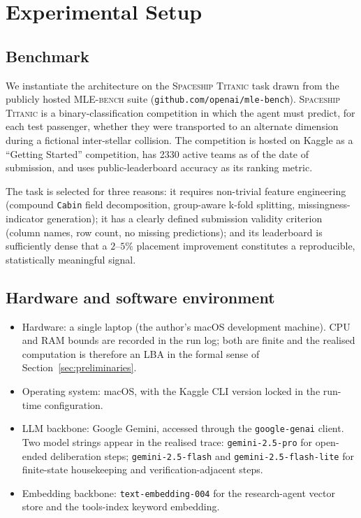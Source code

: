 \section{Experimental Setup}
\label{sec:expsetup}

\subsection{Benchmark}

We instantiate the architecture on the \textsc{Spaceship Titanic}
task drawn from the publicly hosted \textsc{MLE-bench} suite
(\texttt{github.com/openai/mle-bench}).
\textsc{Spaceship Titanic} is a binary-classification competition
in which the agent must predict, for each test passenger, whether
they were transported to an alternate dimension during a fictional
inter-stellar collision.  The competition is hosted on Kaggle as a
``Getting Started'' competition, has 2330 active teams as of the
date of submission, and uses public-leaderboard accuracy as its
ranking metric.

The task is selected for three reasons: it requires non-trivial
feature engineering (compound \texttt{Cabin} field decomposition,
group-aware k-fold splitting, missingness-indicator generation);
it has a clearly defined submission validity criterion (column
names, row count, no missing predictions); and its leaderboard is
sufficiently dense that a $2$--$5\%$ placement improvement
constitutes a reproducible, statistically meaningful signal.

\subsection{Hardware and software environment}

\begin{itemize}
\item Hardware: a single laptop (the author's macOS development
machine).  CPU and RAM bounds are recorded in the run log; both
are finite and the realised computation is therefore an LBA in
the formal sense of Section~\ref{sec:preliminaries}.
\item Operating system: macOS, with the Kaggle CLI version locked
in the run-time configuration.
\item LLM backbone: Google Gemini, accessed through the
\texttt{google-genai} client.  Two model strings appear in the
realised trace: \texttt{gemini-2.5-pro} for open-ended deliberation
steps; \texttt{gemini-2.5-flash} and
\texttt{gemini-2.5-flash-lite} for finite-state housekeeping and
verification-adjacent steps.
\item Embedding backbone: \texttt{text-embedding-004} for the
research-agent vector store and the tools-index keyword
embedding.
\end{itemize}

